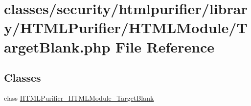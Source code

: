 \hypertarget{HTMLModule_2TargetBlank_8php}{\section{classes/security/htmlpurifier/library/\+H\+T\+M\+L\+Purifier/\+H\+T\+M\+L\+Module/\+Target\+Blank.php File Reference}
\label{HTMLModule_2TargetBlank_8php}
}
\subsection*{Classes}
\begin{DoxyCompactItemize}
\item 
class \hyperlink{classHTMLPurifier__HTMLModule__TargetBlank}{H\+T\+M\+L\+Purifier\+\_\+\+H\+T\+M\+L\+Module\+\_\+\+Target\+Blank}
\end{DoxyCompactItemize}
